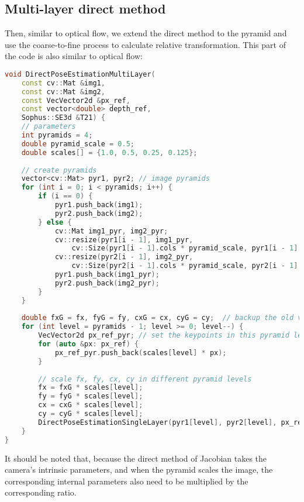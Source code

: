 \subsection{Multi-layer direct method}
Then, similar to optical flow, we extend the direct method to the pyramid and use the coarse-to-fine process to calculate relative transformation. This part of the code is also similar to optical flow:
\begin{lstlisting}[language=c++,caption=slambook2/ch8/direct_method.cpp (snippet)]
void DirectPoseEstimationMultiLayer(
	const cv::Mat &img1,
	const cv::Mat &img2,
	const VecVector2d &px_ref,
	const vector<double> depth_ref,
	Sophus::SE3d &T21) {
	// parameters
	int pyramids = 4;
	double pyramid_scale = 0.5;
	double scales[] = {1.0, 0.5, 0.25, 0.125};
	
	// create pyramids
	vector<cv::Mat> pyr1, pyr2; // image pyramids
	for (int i = 0; i < pyramids; i++) {
		if (i == 0) {
			pyr1.push_back(img1);
			pyr2.push_back(img2);
		} else {
			cv::Mat img1_pyr, img2_pyr;
			cv::resize(pyr1[i - 1], img1_pyr,
				cv::Size(pyr1[i - 1].cols * pyramid_scale, pyr1[i - 1].rows * pyramid_scale));
			cv::resize(pyr2[i - 1], img2_pyr,
				cv::Size(pyr2[i - 1].cols * pyramid_scale, pyr2[i - 1].rows * pyramid_scale));
			pyr1.push_back(img1_pyr);
			pyr2.push_back(img2_pyr);
		}
	}
	
	double fxG = fx, fyG = fy, cxG = cx, cyG = cy;  // backup the old values
	for (int level = pyramids - 1; level >= 0; level--) {
		VecVector2d px_ref_pyr; // set the keypoints in this pyramid level
		for (auto &px: px_ref) {
			px_ref_pyr.push_back(scales[level] * px);
		}
		
		// scale fx, fy, cx, cy in different pyramid levels
		fx = fxG * scales[level];
		fy = fyG * scales[level];
		cx = cxG * scales[level];
		cy = cyG * scales[level];
		DirectPoseEstimationSingleLayer(pyr1[level], pyr2[level], px_ref_pyr, depth_ref, T21);
	}	
}
\end{lstlisting}
It should be noted that, because the direct method of Jacobian takes the camera's intrinsic parameters, and when the pyramid scales the image, the corresponding internal parameters also need to be multiplied by the corresponding ratio.

